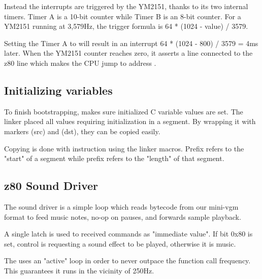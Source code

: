 Instead the interrupts are triggered by the YM2151, thanks to its two internal timers. Timer A is a 10-bit counter while Timer B is an 8-bit counter. For a YM2151 running at 3,579Hz, the trigger formula is 64 * (1024 - value) / 3579.

Setting the Timer A to  will result in an interrupt 64 * (1024 - 800) / 3579 = 4ms later. When the YM2151 counter reaches zero, it asserts a line connected to the z80  line which makes the CPU jump to address .




\subsection{Initializing variables}
To finish bootstrapping,  makes sure initialized C variable values are set. The linker placed all values requiring initialization in a  segment. By wrapping it with markers  (src) and  (dst), they can be copied easily.



Copying is done with  instruction using the linker macros. Prefix  refers to the "start" of a segment while prefix  refers to the "length" of that segment.


 



\subsection{z80 Sound Driver}
The sound driver is a simple loop which reads bytecode from our mini-vgm format to feed music notes, no-op on pauses, and forwards sample playback. 




A single latch is used to received commands as "immediate value". If bit 0x80 is set, control is requesting a sound effect to be played, otherwise it is music. 

The  uses an "active" loop in order to never outpace the  function call frequency. This guarantees it runs in the vicinity of 250Hz. 





